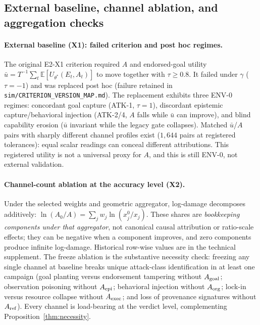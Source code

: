 \subsection{External baseline, channel ablation, and aggregation checks}\label{sec:e2checks}

\paragraph{External baseline (X1): failed criterion and post hoc regimes.}
\begin{sloppypar}
The original E2-X1 criterion required $A$ and endorsed-goal utility
$\bar u=T^{-1}\sum_t\mathbb E[U_{\theta^*}(E_t,A_t)]$ to move together with
$\tau\ge0.8$. It failed under $\gamma$ ($\tau=-1$) and was replaced post hoc
(failure retained in \texttt{sim/CRITERION\_VERSION\_MAP.md}). The replacement
exhibits three ENV-0 regimes: concordant goal capture (ATK-1, $\tau=1$),
discordant epistemic capture/behavioral injection (ATK-2/4, $A$ falls while
$\bar u$ can improve), and blind capability erosion ($\bar u$ invariant while
the legacy gate collapses). Matched $\bar u$/$A$ pairs with sharply different
channel profiles exist ($1{,}644$ pairs at registered tolerances): equal
scalar readings can conceal different attributions. This registered utility is
not a universal proxy for $A$, and this is still ENV-0, not external
validation.
\end{sloppypar}

\paragraph{Channel-count ablation at the accuracy level (X2).}
Under the selected weights and geometric aggregator, log-damage decomposes
additively: $\ln(A_0/A)=\sum_j w_j\ln(x_j^0/x_j)$. These shares are
\emph{bookkeeping components under that aggregator}, not canonical causal
attribution or ratio-scale effects; they can be negative when a component
improves, and zero components produce infinite log-damage. Historical row-wise
values are in the technical supplement. The freeze ablation is the substantive
necessity check: freezing any single channel at baseline breaks unique
attack-class identification in at least one campaign (goal planting versus
endorsement tampering without $A_{\mathrm{goal}}$; observation poisoning without $A_{\mathrm{epi}}$;
behavioral injection without $A_{\mathrm{org}}$; lock-in versus resource collapse without
$A_{\mathrm{exec}}$; and loss of provenance signatures without $A_{\mathrm{ref}}$). Every channel is
load-bearing at the verdict level, complementing
Proposition~\ref{thm:necessity}.

